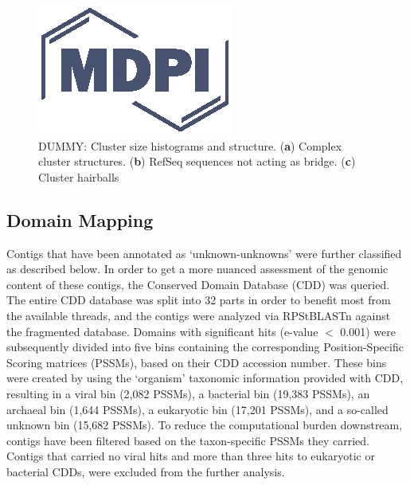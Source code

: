   \begin{figure}
    \centering
    \includegraphics{Definitions/logo-mdpi}
    \caption{DUMMY: Cluster size histograms and structure. (\textbf{a}) Complex
    cluster structures. (\textbf{b}) RefSeq sequences not acting as bridge.
    (\textbf{c}) Cluster hairballs
            \label{fig:cluster_sizes}}
  \end{figure}

  \subsection{Domain Mapping}
  Contigs that have been annotated as ‘unknown-unknowns’ were further
  classified as described below. In order to get a more nuanced assessment of
  the genomic content of these contigs, the Conserved Domain Database (CDD)
  \cite{Marchler-Bauer2017} was queried. The entire CDD database was split into
  32 parts in order to benefit most from the available threads, and the contigs
  were analyzed via RPStBLASTn \citep{Camacho2009} against the fragmented
  database. Domains with significant  hits (e-value $<$ 0.001) were subsequently
  divided into five bins containing the corresponding Position-Specific Scoring
  matrices (PSSMs), based on their CDD accession number. These bins were created
  by using the ‘organism’ taxonomic information provided with CDD, resulting in
  a viral bin (2,082 PSSMs), a bacterial bin (19,383 PSSMs), an archaeal bin
  (1,644 PSSMs), a eukaryotic bin (17,201 PSSMs), and a so-called unknown bin
  (15,682 PSSMs). To reduce the computational burden downstream, contigs have
  been filtered based on the taxon-specific PSSMs they carried. Contigs that
  carried no viral hits and more than three hits to eukaryotic or bacterial
  CDDs, were excluded from the  further analysis.

